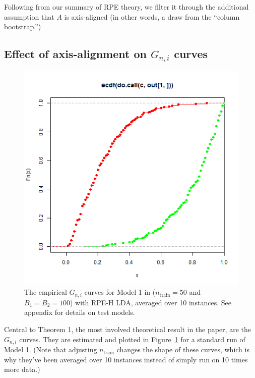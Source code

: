 \documentclass{amsart}
\begin{document}
Following from our summary of RPE theory, we filter it through the additional assumption that $A$ is axis-aligned (in other words, a draw from the ``column bootstrap.'')

\subsection{Effect of axis-alignment on $G_{n,i}$ curves}

\begin{figure}[h]
\begin{centering}
\includegraphics[scale=0.35]{G_ni}%
\par\end{centering}

\caption{The empirical $G_{n,i}$ curves for Model 1 in \cite{CS15} ($n_{\mathrm{train}}=50$ and $B_{1}=B_{2}=100$) with RPE-H LDA,
averaged over 10 instances. See appendix for details on test models.}

\label{fig:std-run-g-curves}
\end{figure}


Central to Theorem 1, the most involved theoretical result in the paper, are
the $G_{n,i}$ curves. They are estimated and plotted in Figure~\ref{fig:std-run-g-curves}
for a standard run of Model 1. (Note that adjusting $n_{\mathrm{train}}$ changes the shape of these curves,
which is why they've been averaged over 10 instances instead of simply
run on 10 times more data.)
\end{document}
